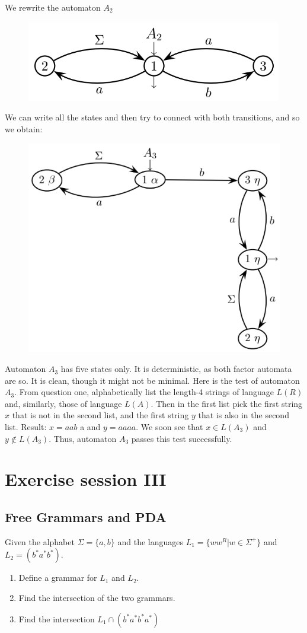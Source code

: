 \documentclass[12pt, a4paper]{report}
\newtheorem[style=M,bodystyle=\normalfont]{theorem}{Theorem}
\newtheorem[style=M,bodystyle=\normalfont]{corollary}{Corollary}
\newtheorem[style=M,bodystyle=\normalfont]{lemma}{Lemma}
\newtheorem[style=M,bodystyle=\normalfont]{definition}{Definition}
\begin{document}
\begin{enumerate}
\begin{figure}[H]
                \end{figure}
                We rewrite the automaton $A_2$
                \begin{figure}[H]
                    \centering
                    \includegraphics[width=0.5\linewidth]{images/FSA6a.png}
                \end{figure}
                We can write all the states and then try to connect with both transitions, and so we obtain: 
                \begin{figure}[H]
                    \centering
                    \includegraphics[width=0.5\linewidth]{images/FSA7a.png}
                \end{figure}
                Automaton $A_3$ has five states only. It is deterministic, as both factor automata are so. It is clean, though it might not be minimal. Here is the test of automaton $A_3$. From question one, 
                alphabetically list the length-4 strings of language $L(R)$ and, similarly, those of language $L(A)$. Then in the first list pick the first string $x$ that is not in the second list, and the first 
                string $y$ that is also in the second list. Result: $x=a a b$ a and $y=a a a a$. We soon see that $x \in L(A_3)$ and $y \notin L(A_3)$. Thus, automaton $A_3$ passes this test successfully.
        \end{enumerate}

\newpage 

\chapter{Exercise session III}
    \section{Free Grammars and PDA}
        Given the alphabet $\Sigma=\{a,b\}$ and the languages $L_1=\{ww^R|w \in \Sigma^{+}\}$ and $L_2=(b^{*}a^{*}b^{*})$.
        \begin{enumerate}
            \item Define a grammar for $L_1$ and $L_2$. 
            \item Find the intersection of the two grammars. 
            \item Find the intersection $L_1 \cap (b^{*}a^{*}b^{*}a^{*})$
        \end{enumerate}
\end{document}
